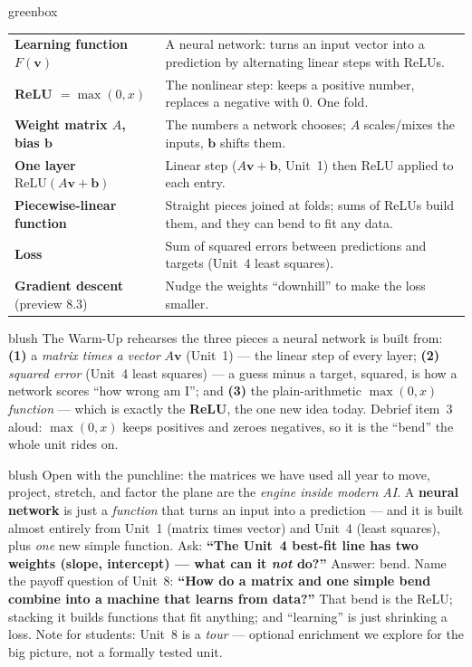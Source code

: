 \documentclass[10pt]{article}
\newcommand{\vv}{\mathbf{v}}
\newcommand{\bb}{\mathbf{b}}
\newcommand{\relu}{\mathrm{ReLU}}
\begin{document}
\begin{skillbox}{greenbox}
\renewcommand{\arraystretch}{1.3}
\begin{tabularx}{\linewidth}{@{}l X@{}}
\textbf{Learning function $F(\vv)$} & A neural network: turns an input vector into a prediction by alternating linear steps with ReLUs. \\
\textbf{ReLU $=\max(0,x)$} & The nonlinear step: keeps a positive number, replaces a negative with $0$. One fold. \\
\textbf{Weight matrix $A$, bias $\bb$} & The numbers a network chooses; $A$ scales/mixes the inputs, $\bb$ shifts them. \\
\textbf{One layer $\relu(A\vv+\bb)$} & Linear step ($A\vv+\bb$, Unit~1) then ReLU applied to each entry. \\
\textbf{Piecewise-linear function} & Straight pieces joined at folds; sums of ReLUs build them, and they can bend to fit any data. \\
\textbf{Loss} & Sum of squared errors between predictions and targets (Unit~4 least squares). \\
\textbf{Gradient descent} (preview 8.3) & Nudge the weights ``downhill'' to make the loss smaller. \\
\end{tabularx}
\end{skillbox}

\begin{fixedskillbox}{blush}
    The Warm-Up rehearses the three pieces a neural network is built from:
    \textbf{(1)} a \emph{matrix times a vector} $A\vv$ (Unit~1) --- the linear step of every layer;
    \textbf{(2)} \emph{squared error} (Unit~4 least squares) --- a guess minus a target, squared, is how a
    network scores ``how wrong am I''; and \textbf{(3)} the plain-arithmetic \emph{$\max(0,x)$ function} ---
    which is exactly the \textbf{ReLU}, the one new idea today. Debrief item~3 aloud: $\max(0,x)$ keeps
    positives and zeroes negatives, so it is the ``bend'' the whole unit rides on.
\end{fixedskillbox}

\begin{skillbox}[Hook]{blush}
    Open with the punchline: the matrices we have used all year to move, project, stretch, and factor the
    plane are the \emph{engine inside modern AI}. A \textbf{neural network} is just a \emph{function} that
    turns an input into a prediction --- and it is built almost entirely from Unit~1 (matrix times vector)
    and Unit~4 (least squares), plus \emph{one} new simple function. Ask: \textbf{``The Unit~4 best-fit
    line has two weights (slope, intercept) --- what can it \emph{not} do?''} Answer: bend. Name the payoff
    question of Unit~8: \textbf{``How do a matrix and one simple bend combine into a machine that learns
    from data?''} That bend is the ReLU; stacking it builds functions that fit anything; and ``learning''
    is just shrinking a loss. Note for students: Unit~8 is a \emph{tour} --- optional enrichment we explore
    for the big picture, not a formally tested unit.
\end{skillbox}
\end{document}
